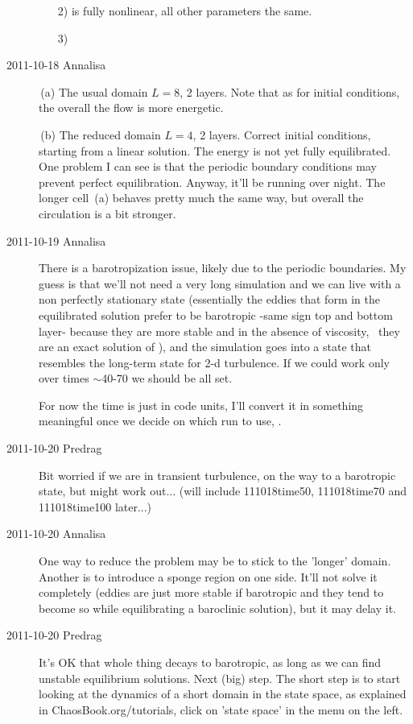 \begin{description}
\begin{enumerate}
  \item [2)] is fully nonlinear, all other parameters the same.

  \item [3)]
\end{enumerate}

\item[2011-10-18 Annalisa]

\,(a)
The usual domain $L=8$, 2 layers. Note that as
for initial conditions, the overall the flow is more energetic.

\,(b)
The reduced domain $L=4$, 2 layers. Correct initial conditions, starting
from a linear solution. The energy is not yet fully equilibrated. One
problem I can see is that the periodic boundary conditions may prevent
perfect equilibration. Anyway, it'll be running over night. The longer
cell \,(a) behaves pretty much the same way, but
overall the circulation is a bit stronger.

\item[2011-10-19 Annalisa]
There is a barotropization issue, likely due to the periodic boundaries.
My guess is that we'll not need a very long simulation and we can live
with a non perfectly stationary state (essentially the eddies that form
in the equilibrated solution prefer to be barotropic -same sign top and
bottom layer- because they are more stable and in the absence of
viscosity, \etc\ they are an exact solution of \NS), and the simulation goes
into a state that resembles the long-term state for 2-d turbulence. If we
could work only over times $\sim $40-70 we should be all set.

For now the time is just in code units, I'll convert it in something
meaningful once we decide on which run to use, \etc.

\item[2011-10-20 Predrag]
Bit worried if we are in transient turbulence, on the way to a
barotropic state, but might work out... (will include 111018time50,
111018time70 and 111018time100 later...)

\item[2011-10-20 Annalisa]
One way to reduce the problem may be to stick to the 'longer' domain.
Another is to introduce a sponge region on one side. It'll not solve it
completely (eddies are just more stable if barotropic and they tend to
become so while equilibrating a baroclinic solution), but it may delay
it.

\item[2011-10-20 Predrag]
It's OK that whole thing decays to barotropic, as long as we can find
unstable equilibrium solutions. Next (big) step. The short step is
to start looking at the dynamics of a short domain in the state space,
as explained in ChaosBook.org/tutorials, click on 'state space' in the
menu on the left.


\end{description}

